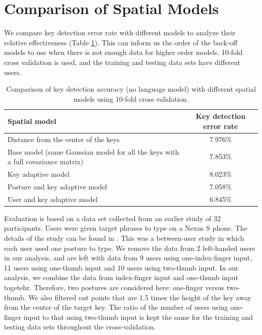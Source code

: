\documentclass{sigchi}
\newcommand\tabhead[1]{\small\textbf{#1}}
\begin{document}
\section{Comparison of Spatial Models}
We compare key detection error rate with different models to analyze their
relative effectiveness (Table \ref{tab:comparison}). This can inform us the order of the
back-off models to use when there is not enough data for higher order models.
10-fold cross validation is used, and the training and testing data sets have
different users.

\begin{table} [tb]
  \centering
  \begin{tabular}{|l|c|}
    \hline
    \tabhead{Spatial model} &
    \multicolumn{1}{|p{0.2\columnwidth}|}{\centering\tabhead{Key detection
    error rate}} \\
    \hline
    Distance from the center of the keys & 7.976\% \\
    \hline
    \multicolumn{1}{|p{0.7\columnwidth}|}{Base model (same Gaussian model for
    all the keys with a full covariance matrix)} & 7.853\% \\
    \hline
    Key adaptive model  & 8.023\% \\
    \hline
    Posture and key adaptive model & 7.058\% \\
    \hline
    User and key adaptive model  & 6.845\% \\
    \hline
  \end{tabular}
  \caption{Comparison of key detection accuracy (no language model) with
  different spatial models using 10-fold cross validation.}
  \label{tab:comparison}
\end{table}

Evaluation is based on a data set collected from an earlier study of 32
participants. Users were given target phrases to type on a Nexus S phone. The
details of the study can be found in \cite{Azenkot:2012}. This was a between-user
study in which each user used one posture to type.
We remove the data from 2 left-handed users in our analysis, and are left with
data from 9 users using one-index-finger input, 11 users using one-thumb input and
10 users using two-thumb input.  In our analysis, we combine the data from index-finger input
and one-thumb input togetehr. Therefore, two postures are considered here: one-finger versus two-thumb. We also filtered out points that are 1.5 times
the height of the key away from the center of the target key. The ratio
of the number of users using one-finger input to that using two-thumb input is kept the same
for the training and testing data sets throughout the cross-validation.
\end{document}
